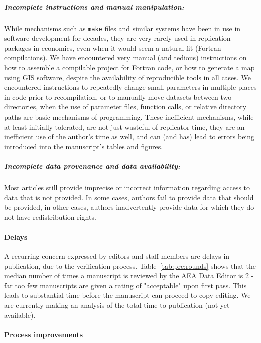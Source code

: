 \documentclass[PP]{AEA}
\begin{document}
\subparagraph{Incomplete instructions and manual manipulation:} While mechanisms such as \texttt{make} files and similar systems have been in use in software development for decades, they are very rarely used in replication packages in economics, even when it would seem a natural fit (Fortran compilations). We have encountered very manual (and tedious) instructions on how to assemble a compilable project for Fortran code, or how to generate a map using GIS software, despite the availability of reproducible tools in all cases. We encountered instructions to repeatedly change small parameters in multiple places in code prior to recompilation, or to manually move datasets between two directories, when the use of parameter files, function calls, or relative directory paths are basic mechanisms of programming. These inefficient mechanisms, while at least initially tolerated, are not just wasteful of replicator time, they are an inefficient use of the author's time as well, and can (and has) lead to errors being introduced into the manuscript's tables and figures. 

\subparagraph{Incomplete data provenance and data availability:} Most articles still provide imprecise or incorrect information regarding access to data that is not provided. In some cases, authors fail to provide data that should be provided, in other cases, authors inadvertently provide data for which they do not have redistribution rights. 

\paragraph{Delays} 

A recurring concern expressed by editors and staff members are delays in publication, due to the verification process. Table~\ref{tab:pre:rounds} shows that the median number of times a manuscript is reviewed by the AEA Data Editor is 2 - far too few manuscripts are given a rating of "acceptable" upon first pass. This leads to substantial time before the manuscript can proceed to copy-editing. We are currently making an analysis of the total time to publication (not yet available).

\paragraph{Process improvements}
\end{document}

